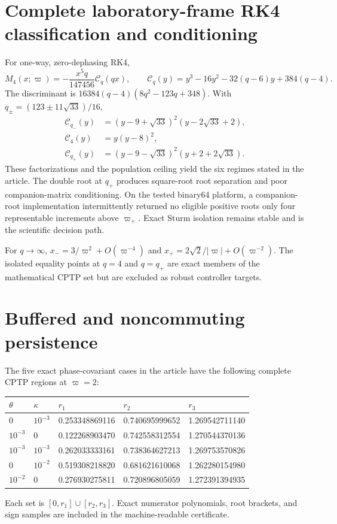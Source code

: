 \documentclass[11pt]{article}
\begin{document}
\section{Complete laboratory-frame RK4 classification and conditioning}
For one-way, zero-dephasing RK4,
\begin{equation}
 M_4(x;\varpi)=-\frac{x^5q}{147456}\mathcal C_q(qx),\qquad
 \mathcal C_q(y)=y^3-16y^2-32(q-6)y+384(q-4).
\end{equation}
The discriminant is $16384(q-4)(8q^2-123q+348)$. With $q_\pm=(123\pm11\sqrt{33})/16$,
\begin{align}
\mathcal C_{q_-}(y)&=(y-9+\sqrt{33})^2(y-2\sqrt{33}+2),\\
\mathcal C_4(y)&=y(y-8)^2,\\
\mathcal C_{q_+}(y)&=(y-9-\sqrt{33})^2(y+2+2\sqrt{33}).
\end{align}
These factorizations and the population ceiling yield the six regimes stated in the article. The double root at $q_+$ produces square-root root separation and poor companion-matrix conditioning. On the tested binary64 platform, a companion-root implementation intermittently returned no eligible positive roots only four representable increments above $\varpi_+$. Exact Sturm isolation remains stable and is the scientific decision path.

For $q\to\infty$, $x_-=3/\varpi^2+O(\varpi^{-4})$ and $x_+=2\sqrt2/|\varpi|+O(\varpi^{-2})$. The isolated equality points at $q=4$ and $q=q_+$ are exact members of the mathematical CPTP set but are excluded as robust controller targets.

\section{Buffered and noncommuting persistence}
The five exact phase-covariant cases in the article have the following complete CPTP regions at $\varpi=2$:
\begin{center}
\begin{tabular}{lllll}
\toprule
$\theta$ & $\kappa$ & $r_1$ & $r_2$ & $r_3$\\
\midrule
$0$ & $10^{-3}$ & 0.253348869116 & 0.740695999652 & 1.269542711140\\
$10^{-3}$ & $0$ & 0.122268903470 & 0.742558312554 & 1.270544370136\\
$10^{-3}$ & $10^{-3}$ & 0.262033333161 & 0.738364627213 & 1.269753570826\\
$0$ & $10^{-2}$ & 0.519308218820 & 0.681621610068 & 1.262280154980\\
$10^{-2}$ & $0$ & 0.276930275811 & 0.720896805059 & 1.272391394935\\
\bottomrule
\end{tabular}
\end{center}
Each set is $[0,r_1]\cup[r_2,r_3]$. Exact numerator polynomials, root brackets, and sign samples are included in the machine-readable certificate.
\end{document}
